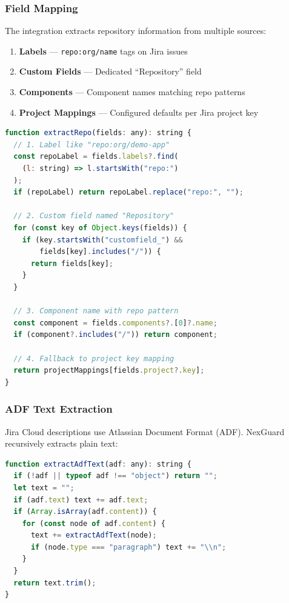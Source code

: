 \documentclass[11pt,a4paper]{article}
\begin{document}
\newpage
\subsubsection{Field Mapping}
The integration extracts repository information from multiple sources:

\begin{enumerate}
    \item \textbf{Labels} --- \texttt{repo:org/name} tags on Jira issues
    \item \textbf{Custom Fields} --- Dedicated ``Repository'' field
    \item \textbf{Components} --- Component names matching repo patterns
    \item \textbf{Project Mappings} --- Configured defaults per Jira project key
\end{enumerate}

\begin{lstlisting}[language=JavaScript,caption=Repo Extraction Logic]
function extractRepo(fields: any): string {
  // 1. Label like "repo:org/demo-app"
  const repoLabel = fields.labels?.find(
    (l: string) => l.startsWith("repo:")
  );
  if (repoLabel) return repoLabel.replace("repo:", "");
  
  // 2. Custom field named "Repository"
  for (const key of Object.keys(fields)) {
    if (key.startsWith("customfield_") && 
        fields[key].includes("/")) {
      return fields[key];
    }
  }
  
  // 3. Component name with repo pattern
  const component = fields.components?.[0]?.name;
  if (component?.includes("/")) return component;
  
  // 4. Fallback to project key mapping
  return projectMappings[fields.project?.key];
}
\end{lstlisting}

\subsubsection{ADF Text Extraction}
Jira Cloud descriptions use Atlassian Document Format (ADF). NexGuard recursively extracts plain text:

\begin{lstlisting}[language=JavaScript,caption=ADF Parser]
function extractAdfText(adf: any): string {
  if (!adf || typeof adf !== "object") return "";
  let text = "";
  if (adf.text) text += adf.text;
  if (Array.isArray(adf.content)) {
    for (const node of adf.content) {
      text += extractAdfText(node);
      if (node.type === "paragraph") text += "\\n";
    }
  }
  return text.trim();
}
\end{lstlisting}
\end{document}

